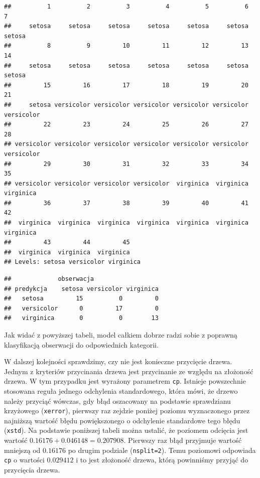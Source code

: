 \documentclass[
]{book}
\newenvironment{Shaded}{\begin{snugshade}}{\end{snugshade}}
\newcommand{\AttributeTok}[1]{\textcolor[rgb]{0.13,0.29,0.53}{#1}}
\newcommand{\FunctionTok}[1]{\textcolor[rgb]{0.13,0.29,0.53}{\textbf{#1}}}
\newcommand{\NormalTok}[1]{#1}
\newcommand{\OtherTok}[1]{\textcolor[rgb]{0.56,0.35,0.01}{#1}}
\newcommand{\SpecialCharTok}[1]{\textcolor[rgb]{0.81,0.36,0.00}{\textbf{#1}}}
\theoremstyle{plain}
\theoremstyle{definition}
\theoremstyle{definition}
\theoremstyle{definition}
\theoremstyle{definition}
\theoremstyle{definition}
\theoremstyle{remark}
\begin{document}
\begin{verbatim}
##          1          2          3          4          5          6          7 
##     setosa     setosa     setosa     setosa     setosa     setosa     setosa 
##          8          9         10         11         12         13         14 
##     setosa     setosa     setosa     setosa     setosa     setosa     setosa 
##         15         16         17         18         19         20         21 
##     setosa versicolor versicolor versicolor versicolor versicolor versicolor 
##         22         23         24         25         26         27         28 
## versicolor versicolor versicolor versicolor versicolor versicolor versicolor 
##         29         30         31         32         33         34         35 
## versicolor versicolor versicolor versicolor  virginica  virginica  virginica 
##         36         37         38         39         40         41         42 
##  virginica  virginica  virginica  virginica  virginica  virginica  virginica 
##         43         44         45 
##  virginica  virginica  virginica 
## Levels: setosa versicolor virginica
\end{verbatim}

\begin{Shaded}
\end{Shaded}

\begin{verbatim}
##             obserwacja
## predykcja    setosa versicolor virginica
##   setosa         15          0         0
##   versicolor      0         17         0
##   virginica       0          0        13
\end{verbatim}

Jak widać z powyższej tabeli, model całkiem dobrze radzi sobie z poprawną klasyfikacją obserwacji do odpowiednich kategorii.

W dalszej kolejności sprawdzimy, czy nie jest konieczne przycięcie drzewa. Jednym z kryteriów przycinania drzewa jest przycinanie ze względu na złożoność drzewa. W tym przypadku jest wyrażony parametrem \texttt{cp}. Istnieje powszechnie stosowana reguła jednego odchylenia standardowego, która mówi, że drzewo należy przyciąć wówczas, gdy błąd oszacowany na podstawie sprawdzianu krzyżowego (\texttt{xerror}), pierwszy raz zejdzie poniżej poziomu wyznaczonego przez najniższą wartość błędu powiększonego o odchylenie standardowe tego błędu (\texttt{xstd}). Na podstawie poniższej tabeli można ustalić, że poziomem odcięcia jest wartość \(0.16176+0.046148=0.207908\). Pierwszy raz błąd przyjmuje wartość mniejszą od \(0.16176\) po drugim podziale (\texttt{nsplit=2}). Temu poziomowi odpowiada \texttt{cp} o wartości \(0.029412\) i to jest złożoność drzewa, którą powinniśmy przyjąć do przycięcia drzewa.
\end{document}
